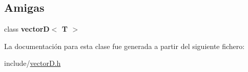 \subsection*{Amigas}
\begin{DoxyCompactItemize}
\item 
\mbox{\label{classvectorD_1_1iterator_a27e3ba75af96dbb2a41d9c34e758991a}} 
class {\bfseries vector\+D$<$ T $>$}
\end{DoxyCompactItemize}


La documentación para esta clase fue generada a partir del siguiente fichero\+:\begin{DoxyCompactItemize}
\item 
include/\hyperlink{vectorD_8h}{vector\+D.\+h}\end{DoxyCompactItemize}
